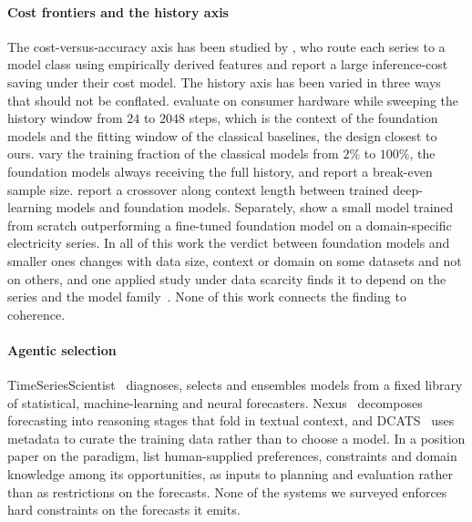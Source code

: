 \documentclass[review,number]{elsarticle}
\begin{document}
\paragraph{Cost frontiers and the history axis} The cost-versus-accuracy axis has
been studied by \citet{operationalviability2026}, who route each series to a model
class using empirically derived features and report a large inference-cost saving under
their cost model. The history axis has been varied in three ways that should not be
conflated. \citet{energyload2026} evaluate on consumer hardware while sweeping the
history window from $24$ to $2048$ steps, which is the context of the foundation models
and the fitting window of the classical baselines, the design closest to ours.
\citet{breakeven2026} vary the training fraction of the classical models from $2\%$ to
$100\%$, the foundation models always receiving the full history, and report a
break-even sample size. \citet{quitobench2026} report a crossover along context length
between trained deep-learning models and foundation models. Separately,
\citet{foundational2025} show a small model trained from scratch outperforming a
fine-tuned foundation model on a domain-specific electricity series. In all of this
work the verdict between foundation models and smaller ones changes with data size,
context or domain on some datasets and not on others, and one applied
study under data scarcity finds it to depend on the series and the model
family~\citep{enrolment2026}. None of this work connects the finding to
coherence.

\paragraph{Agentic selection} TimeSeriesScientist~\citep{tsci2025} diagnoses,
selects and ensembles models from a fixed library of statistical, machine-learning and
neural forecasters. Nexus~\citep{nexus2026} decomposes forecasting
into reasoning stages that fold in textual context, and DCATS~\citep{dcats2025} uses
metadata to curate the training data rather than to choose a model. In a position paper
on the paradigm, \citet{atsf2026} list human-supplied preferences, constraints and domain
knowledge among its opportunities, as inputs to planning and evaluation rather than as
restrictions on the forecasts. None of
the systems we surveyed enforces hard constraints on the forecasts it emits.
\end{document}
